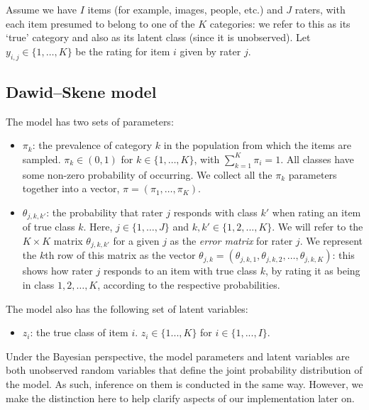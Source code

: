 Assume we have \(I\) items (for example, images, people, etc.) and \(J\) raters,
with each item presumed to belong to one of the \(K\) categories: we refer to
this as its `true' category and also as its latent class (since it is unobserved).
Let \(y_{i, j} \in \{1, \dots, K\}\) be the rating for item \(i\) given by
rater \(j\).

\hypertarget{sec:dawid-skene}{%
\subsection{Dawid--Skene model}\label{sec:dawid-skene}}

The model has two sets of parameters:

\begin{itemize}
\item
  \(\pi_k\): the prevalence of category \(k\) in the population from which
  the items are sampled. \(\pi_k \in (0, 1)\) for
  \(k \in \{1, \dots, K\}\), with \(\sum_{k = 1}^K \pi_i = 1\). All classes
  have some non-zero probability of occurring. We collect
  all the \(\pi_k\) parameters together into a vector,
  \(\pi = (\pi_1, \dots, \pi_K)\).
\item
  \(\theta_{j, k, k'}\): the probability that rater \(j\) responds with
  class \(k'\) when rating an item of true class \(k\). Here, \(j \in \{1,  \dots, J\}\) and \(k, k' \in \{1, 2, ..., K\}\). We will refer
  to the \(K  \times K\) matrix \(\theta_{j, k, k'}\) for a given \(j\) as the
  \emph{error matrix} for rater \(j\). We represent the \(k\)th row of this
  matrix as the vector
  \(\theta_{j, k} = \left(\theta_{j, k, 1}, \theta_{j, k, 2},  \dots, \theta_{j, k, K}\right)\): this shows how rater \(j\)
  responds to an item with true class \(k\), by rating it as being in
  class \(1, 2,  \dots, K\), according to the respective probabilities.
\end{itemize}

The model also has the following set of latent variables:

\begin{itemize}
\tightlist
\item
  \(z_i\): the true class of item \(i\). \(z_i \in \{1 ..., K\}\) for \(i \in  \{1, ..., I\}\).
\end{itemize}

Under the Bayesian perspective, the model parameters and latent variables are both
unobserved random variables that define the joint probability
distribution of the model. As such, inference on them is conducted in
the same way. However, we make the distinction here to help clarify
aspects of our implementation later on.

